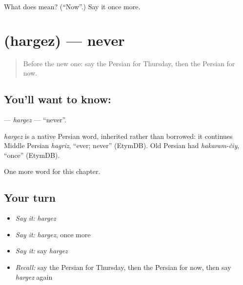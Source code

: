 \begin{tcolorbox}[breakable,colback=teal!4,colframe=teal!35!black,title={Before you move on}]
What does  mean? (\textquotedblleft{}Now\textquotedblright{}.) Say it once more.
\end{tcolorbox}
\section[\texorpdfstring{\fa{هرگز} (hargez)}{هرگز (hargez)}]{ (hargez) — never}

\label{lesson:FA-C82-hargez}



\begin{quote}
Before the new one: say the Persian for Thursday, then the Persian for now.
\end{quote}

\subsection*{You'll want to know: }
\textbf{} — \emph{hargez} — \textquotedblleft{}never\textquotedblright{}.

\begin{cousinweb}
\emph{hargez} is a native Persian word, inherited rather than borrowed: it continues Middle Persian \emph{hagriz}, \textquotedblleft{}ever; never\textquotedblright{} (EtymDB). Old Persian had \emph{hakaram-čiy}, \textquotedblleft{}once\textquotedblright{} (EtymDB).
\end{cousinweb}

\begin{grammarlens}[title={What you've built}]
One more word for this chapter.
\end{grammarlens}

\subsection*{Your turn}
\begin{itemize}
\raggedright
  \item \emph{Say it:} \emph{hargez}
  \item \emph{Say it:} \emph{hargez}, once more
  \item \emph{Say it:} say \emph{hargez}
  \item \emph{Recall:} say the Persian for Thursday, then the Persian for now, then say \emph{hargez} again
\end{itemize}

